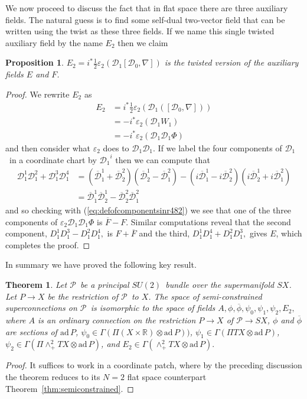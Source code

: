 \documentclass[twoside]{amsart}
\newcommand{\RR}{\ensuremath{\mathbb{R}}}
\newtheorem{theorem}{Theorem}
\newtheorem{prop}{Proposition}
\renewcommand{\eqref}[1]{(\ref{eq:#1})}
\newcommand{\thmref}[1]{Theorem~\ref{thm:#1}}
\renewcommand{\epsilon}{\varepsilon}
\newcommand{\enm}[1]{\ensuremath{#1}}
\renewcommand{\bar}[1]{\overline{#1}}
\newcommand{\sut}{\enm{SU(2)}}
\newcommand{\pp}{\enm{\mathcal{P}}}
\newcommand{\ad}{\enm{\mathrm{ad}}}
\renewcommand{\epsilon}{\varepsilon}
\newcommand{\upperlowerabc}[3]{\enm{{#1}^{#2}_{#3}}}
\newcommand{\upperdotlowerabc}[3]{\upperlowerabc{#1}{#2}{\dot{#3}}}
\newcommand{\dudlc}[2]{\upperdotlowerabc{\bar{\mathcal{D}}}{#1}{#2}}
\newcommand{\nab}{\enm{\nabla}}
\newcommand{\doc}{\enm{\mathcal{D}_{1}}}
\newcommand{\dzc}{\enm{\mathcal{D}_{0}}}
\newcommand{\dd}{\enm{\mathcal{D}}}
\newcommand{\adp}{\enm{\ad\,P}}
\begin{document}
We now proceed to discuss the fact that in flat space there are three
auxiliary fields.  The natural guess is to find some self-dual
two-vector field that can be written using the twist as these three
fields.  If we name this single twisted auxiliary field by the name \(
E_{2} \) then we claim
\begin{prop}
    \label{prop:auxiliaryequivalence}
    \( E_{2} = i^{*}\frac{1}{2}\epsilon_{2}(\doc[\dzc,\nab]) \)
is the twisted version of the auxiliary fields \( E \) and \( F \).
\end{prop}
\begin{proof} We rewrite \( E_{2} \) as
\begin{align*}
    E_{2} &= i^{*}\frac{1}{2}\epsilon_{2}(\doc([\dzc,\nab])) \\
          &= -i^{*}\epsilon_{2}(\doc W_{1}) \\
            &= -i^{*}\epsilon_{2}(\doc\doc \Phi)
\end{align*}
and then consider what \( \epsilon_{2} \) does to \( \doc\doc. \)  If
we
label the four components of \doc\ in a coordinate chart by \(
\doc^{i}
\) then we can compute that
\begin{align*}
    \dd_{1}^{1}\dd_{1}^{2}+\dd_{1}^{3}\dd_{1}^{4} &=
       (\dudlc{1}{1} + \dudlc{2}{2})(\dudlc{1}{2} - \dudlc{2}{1})
      -(i\dudlc{1}{1} - i\dudlc{2}{2})(i\dudlc{1}{2} + i\dudlc{2}{1}) \\
      &= \dudlc{1}{1}\dudlc{1}{2} - \dudlc{2}{2}\dudlc{2}{1}
\end{align*}
and so checking with \eqref{defofcomponentsinr482} we see that one of
the three components of \( \epsilon_{2}\doc\doc\Phi \) is \(
\bar{F}-F.
\)  Similar computations reveal that the second component, \(
D_{1}^{1}D_{1}^{3}-D_{1}^{2}D_{1}^{4}, \) is \(
F+\bar{F} \) and the third, \( D_{1}^{1}D_{1}^{4}+D_{1}^{2}D_{1}^{3},
\) gives \( E \), which completes the proof.
\end{proof}

In summary we have proved the following key result.
\begin{theorem}
    Let \pp\ be a principal \sut\ bundle over the supermanifold \( SX
    \).  Let \( P\to X \) be the restriction of \pp\ to \( X \).
    The space of semi-constrained superconnections on \pp\ is
    isomorphic to the space of fields \( A, \phi, \bar{\phi},
    \psi_{0}, \psi_{1}, \psi_{2}, E_{2}, \) where \( A \) is an
    ordinary connection on the restriction \( P\to X \) of \( \pp\to
SX
    \),  \( \phi \) and \( \bar{\phi} \)  are sections of \( \adp
    \), \( \psi_{0} \in \Gamma(\Pi(X\times\RR)\otimes\adp)) \), \(
    \psi_{1} \in \Gamma(\Pi TX\otimes\adp) \), \(
    \psi_{2} \in \Gamma(\Pi\wedge^{2}_{+}TX\otimes\adp)
    \), and \( E_{2}\in \Gamma(\wedge^{2}_{+}TX\otimes\adp). \)
\end{theorem}
\begin{proof} It suffices to work in a coordinate patch, where by the
preceding discussion the theorem reduces to its \( N=2 \) flat space
counterpart \thmref{semiconstrained}.
\end{proof}
\end{document}
